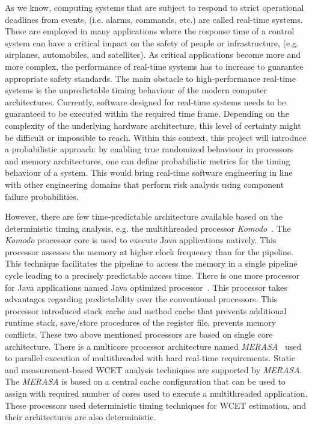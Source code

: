 As we know, computing systems that are subject to respond to strict operational deadlines from events, (i.e. alarms, commands,
etc.)  are called real-time systems. These are employed in many applications where the response time of a control system can have a critical impact on the safety of people or infrastructure, (e.g. airplanes, automobiles, and satellites). As critical applications become more and more complex, the performance of real-time systems has to increase to guarantee appropriate safety standards. The main obstacle to high-performance real-time systems is the unpredictable timing behaviour of the modern computer architectures. Currently, software designed for real-time systems needs to be guaranteed to be executed within the required time frame. Depending on the complexity of the underlying hardware architecture, this level of certainty might be difficult or impossible to reach. Within this context, this project will introduce a probabilistic approach: by enabling true randomized behaviour in processors and memory architectures, one can define
probabilistic metrics for the timing behaviour of a system. This would bring real-time software engineering in line with other engineering domains that perform risk analysis using component failure probabilities. 

However, there are few time-predictable architecture available based on the deterministic timing analysis, e.g. the multithreaded processor \textit{Komodo}~\cite{kreuzinger1999komodo}. The \textit{Komodo} processor core is used to execute Java applications natively. This processor assesses the memory at higher clock frequency than for the pipeline. This technique facilitates the pipeline to access the memory in a single pipeline cycle leading to a precisely predictable access time. There is one more processor for Java applications named Java optimized processor~\cite{Schoeberl:2009:TCA:1540555.1554265}. This processor takes advantages regarding predictability over the conventional processors. This processor introduced stack cache and method cache that prevents additional runtime stack, save/store procedures of the register file, prevents memory conflicts. These two above mentioned processors are based on single core architecture.  There is a multicore processor architecture named \textit{MERASA}~\cite{ungerer2010merasa} used to parallel execution of multithreaded with hard real-time requirements. Static and measurement-based WCET analysis techniques are supported by  \textit{MERASA}. The \textit{MERASA} is based on a central cache configuration that can be used to assign with required number of cores used to execute a multithreaded application. These processors used deterministic timing techniques for WCET estimation, and their architectures are also deterministic.

